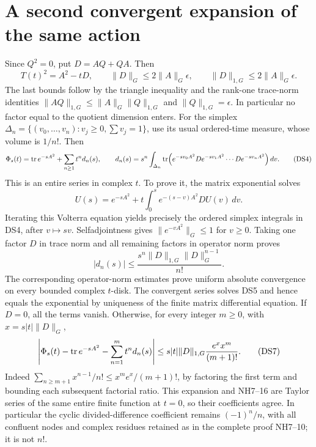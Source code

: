 \documentclass[11pt]{article}
\begin{document}
\section{A second convergent expansion of the same action}
Since \(Q^2=0\), put \(D=AQ+QA\). Then
\[
 T(t)^2=A^2-tD,\qquad
 \|D\|_G\le 2\|A\|_G\epsilon,\qquad
 \|D\|_{1,G}\le 2\|A\|_G\epsilon .
 \tag{DS3}
\]
The last bounds follow by the triangle inequality and the rank-one
trace-norm identities \(\|AQ\|_{1,G}\le\|A\|_G\|Q\|_{1,G}\) and
\(\|Q\|_{1,G}=\epsilon\). In particular no factor equal to the quotient
dimension enters.
For the simplex
\(\Delta_n=\{(v_0,\ldots,v_n):v_j\ge0,\sum v_j=1\}\), use its usual
ordered-time measure, whose volume is \(1/n!\). Then
\[
 \Phi_s(t)=\operatorname{tr} e^{-sA^2}+\sum_{n\ge1}t^n d_n(s),\qquad
 d_n(s)=s^n\int_{\Delta_n}
 \operatorname{tr}\!\left(e^{-sv_0A^2}D e^{-sv_1A^2}\cdots D e^{-sv_nA^2}\right)dv .
 \tag{DS4}
\]
This is an entire series in complex \(t\). To prove it, the matrix
exponential solves
\[
 U(s)=e^{-sA^2}
       +t\int_0^s e^{-(s-v)A^2}D U(v)\,dv.
 \tag{DS5}
\]
Iterating this Volterra equation yields precisely the ordered simplex
integrals in DS4, after \(v\mapsto sv\). Selfadjointness gives
\(\|e^{-vA^2}\|_G\le1\) for \(v\ge0\).
Taking one factor \(D\) in trace norm and all remaining factors in
operator norm proves
\[
 |d_n(s)|\le \frac{s^n\|D\|_{1,G}\|D\|_G^{n-1}}{n!}.
 \tag{DS6}
\]
The corresponding operator-norm estimates prove uniform absolute
convergence on every bounded complex \(t\)-disk. The convergent series
solves DS5 and hence equals the exponential by uniqueness of the finite
matrix differential equation. If \(D=0\), all the terms vanish.
Otherwise, for every integer \(m\ge0\), with \(x=s|t|\|D\|_G\),
\[
 \left|\Phi_s(t)-\operatorname{tr} e^{-sA^2}-\sum_{n=1}^m t^nd_n(s)\right|
 \le s|t|\|D\|_{1,G}\frac{e^x x^m}{(m+1)!}.
 \tag{DS7}
\]
Indeed \(\sum_{n\ge m+1}x^{n-1}/n!
\le x^m e^x/(m+1)!\), by factoring the first term and bounding each
subsequent factorial ratio. This expansion and NH7--16 are Taylor
series of the same entire finite function at \(t=0\), so their
coefficients agree. In particular the cyclic divided-difference
coefficient remains \((-1)^n/n\), with all confluent nodes and complex
residues retained as in the complete proof NH7--10; it is not \(n!\).
\end{document}
